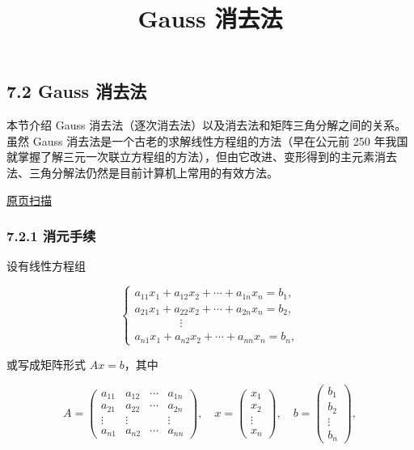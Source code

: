 \documentclass[
  10pt,
  fontset=fandol]{ctexart}
\title{Gauss 消去法}
\author{}
\date{}
\begin{document}
\maketitle

\subsection{7.2 Gauss 消去法}\label{gauss-ux6d88ux53bbux6cd5}

本节介绍 Gauss 消去法（逐次消去法）以及消去法和矩阵三角分解之间的关系。虽然 Gauss 消去法是一个古老的求解线性方程组的方法（早在公元前 250 年我国就掌握了解三元一次联立方程组的方法），但由它改进、变形得到的主元素消去法、三角分解法仍然是目前计算机上常用的有效方法。

\href{../../source-images/pdf-178.jpeg}{原页扫描}

\subsubsection{7.2.1 消元手续}\label{ux6d88ux5143ux624bux7eed}

设有线性方程组

\[
\begin{cases}
a_{11}x_1+a_{12}x_2+\cdots+a_{1n}x_n=b_1,\\
a_{21}x_1+a_{22}x_2+\cdots+a_{2n}x_n=b_2,\\
\qquad\qquad\vdots\\
a_{n1}x_1+a_{n2}x_2+\cdots+a_{nn}x_n=b_n,
\end{cases}
\tag{7.2.1}
\]

或写成矩阵形式 \(Ax=b\)，其中

\[
A=\begin{pmatrix}
a_{11}&a_{12}&\cdots&a_{1n}\\
a_{21}&a_{22}&\cdots&a_{2n}\\
\vdots&\vdots&&\vdots\\
a_{n1}&a_{n2}&\cdots&a_{nn}
\end{pmatrix},\quad
x=\begin{pmatrix}x_1\\x_2\\\vdots\\x_n\end{pmatrix},\quad
b=\begin{pmatrix}b_1\\b_2\\\vdots\\b_n\end{pmatrix},
\]
\end{document}
